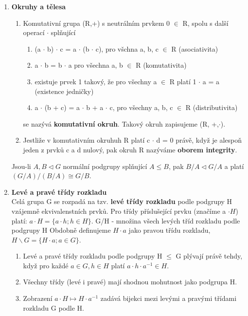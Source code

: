 \documentclass[12pt,a4paper]{article}
\begin{document}
\begin{enumerate}
		\item \textbf{Okruhy a tělesa}
		\begin{enumerate}
			\item Komutativní grupa (R,+) s neutrálním prvkem 0 $\in$ R, spolu s další operací $\cdot$ splňující
			 \begin{enumerate}
				\item (a $\cdot$ b) $\cdot$ c = a $\cdot$ (b $\cdot$ c), pro všchna a, b, c $\in$ R (asociativita)
				\item a $\cdot$ b = b $\cdot$ a pro všechna a, b $\in$ R (komutativita)
				\item existuje prvek 1 takový, že pro všechny a $\in$ R platí 1 $\cdot$ a = a (existence jedničky)
				\item a $\cdot$ (b + c) = a $\cdot$ b + a $\cdot$ c, pro všechny a, b, c $\in$ R (distributivita)
			 \end{enumerate}
			se nazývá \textbf{komutativní okruh}. Takový okruh zapisujeme (R, +,$\cdot$).
			
			\item Jestliže v komutativním okruhuh R platí c $\cdot$ d = 0 právě, když je alespoň jeden z prvků c a d nulový, pak okruh R nazýváme \textbf{oborem integrity}.
			
	\end{enumerate}
	
		
		Jsou-li $A, B \lhd G$ normální podgrupy splňující $A \leq B$, pak $B/A \lhd G/A$ a platí $(G/A)/(B/A) \cong G/B$.
		
		
		\item \textbf{Levé a pravé třídy rozkladu} \\
		Celá grupa G se rozpadá na tzv. \textbf{levé třídy rozkladu} podle podgrupy H vzájemně ekvivalenstních prvků.  Pro třídy příslušející prvku (značíme a $\cdot H$) platí: $a \cdot H = \{a \cdot h; h \in H\}$. G/H - množina všech levých tříd rozkladu podle podgrupy H
		Obdobně definujeme $H \cdot a$ jako pravou třídu rozkladu, $H \backslash G = \{H \cdot a; a \in G\}$.
		
		\begin{enumerate}
			\item Levé a pravé třídy rozkladu podle podgrupy H $\leq$ G plývají právě tehdy, když pro každé $a \in G, h \in H$ platí $a \cdot h \cdot a^{-1} \in H$.
			\item Všechny třídy (levé i pravé) mají shodnou mohutnost jako podgrupa H.
			\item Zobrazení $a \cdot H \mapsto H \cdot a^{-1}$ zadává bijekci mezi levými a pravými třídami rozkladu G podle H.
		\end{enumerate}
	

\end{enumerate}
\end{document}
